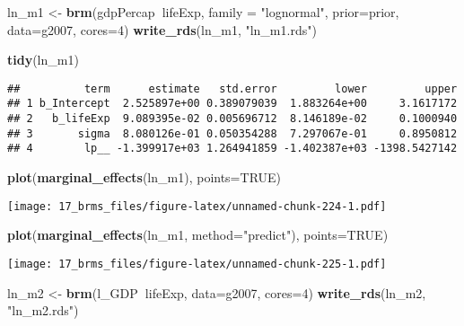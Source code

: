 \documentclass[]{article}
\newenvironment{Shaded}{\begin{snugshade}}{\end{snugshade}}
\newcommand{\KeywordTok}[1]{\textcolor[rgb]{0.13,0.29,0.53}{\textbf{#1}}}
\newcommand{\DataTypeTok}[1]{\textcolor[rgb]{0.13,0.29,0.53}{#1}}
\newcommand{\DecValTok}[1]{\textcolor[rgb]{0.00,0.00,0.81}{#1}}
\newcommand{\StringTok}[1]{\textcolor[rgb]{0.31,0.60,0.02}{#1}}
\newcommand{\OtherTok}[1]{\textcolor[rgb]{0.56,0.35,0.01}{#1}}
\newcommand{\OperatorTok}[1]{\textcolor[rgb]{0.81,0.36,0.00}{\textbf{#1}}}
\newcommand{\NormalTok}[1]{#1}
\begin{document}
\begin{Shaded}
\begin{Highlighting}[]
\NormalTok{ln_m1 <-}\StringTok{ }\KeywordTok{brm}\NormalTok{(gdpPercap}\OperatorTok{~}\NormalTok{lifeExp, }\DataTypeTok{family =} \StringTok{"lognormal"}\NormalTok{, }\DataTypeTok{prior=}\NormalTok{prior, }\DataTypeTok{data=}\NormalTok{g2007, }\DataTypeTok{cores=}\DecValTok{4}\NormalTok{)}
\KeywordTok{write_rds}\NormalTok{(ln_m1, }\StringTok{"ln_m1.rds"}\NormalTok{)}
\end{Highlighting}
\end{Shaded}

\begin{Shaded}
\begin{Highlighting}[]
\KeywordTok{tidy}\NormalTok{(ln_m1)}
\end{Highlighting}
\end{Shaded}

\begin{verbatim}
##          term      estimate   std.error         lower         upper
## 1 b_Intercept  2.525897e+00 0.389079039  1.883264e+00     3.1617172
## 2   b_lifeExp  9.089395e-02 0.005696712  8.146189e-02     0.1000940
## 3       sigma  8.080126e-01 0.050354288  7.297067e-01     0.8950812
## 4        lp__ -1.399917e+03 1.264941859 -1.402387e+03 -1398.5427142
\end{verbatim}

\begin{Shaded}
\begin{Highlighting}[]
\KeywordTok{plot}\NormalTok{(}\KeywordTok{marginal_effects}\NormalTok{(ln_m1), }\DataTypeTok{points=}\OtherTok{TRUE}\NormalTok{)}
\end{Highlighting}
\end{Shaded}

\texttt{[image: 17\_brms\_files/figure-latex/unnamed-chunk-224-1.pdf]}

\begin{Shaded}
\begin{Highlighting}[]
\KeywordTok{plot}\NormalTok{(}\KeywordTok{marginal_effects}\NormalTok{(ln_m1, }\DataTypeTok{method=}\StringTok{"predict"}\NormalTok{), }\DataTypeTok{points=}\OtherTok{TRUE}\NormalTok{)}
\end{Highlighting}
\end{Shaded}

\texttt{[image: 17\_brms\_files/figure-latex/unnamed-chunk-225-1.pdf]}

\begin{Shaded}
\begin{Highlighting}[]
\NormalTok{ln_m2 <-}\StringTok{ }\KeywordTok{brm}\NormalTok{(l_GDP}\OperatorTok{~}\NormalTok{lifeExp, }\DataTypeTok{data=}\NormalTok{g2007, }\DataTypeTok{cores=}\DecValTok{4}\NormalTok{)}
\KeywordTok{write_rds}\NormalTok{(ln_m2, }\StringTok{"ln_m2.rds"}\NormalTok{)}
\end{Highlighting}
\end{Shaded}
\end{document}
